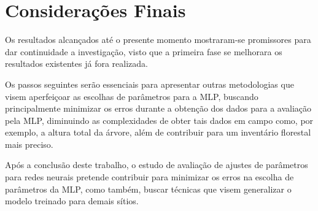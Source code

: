 \chapter{Considerações Finais}
\label{cap:consideracoes_finais}

Os resultados alcançados até o presente momento mostraram-se promissores para dar continuidade a investigação, visto que a primeira fase se melhorara os resultados existentes já fora realizada.

Os passos seguintes serão essenciais para apresentar outras metodologias que visem aperfeiçoar as escolhas de parâmetros para a MLP, buscando principalmente minimizar os erros durante a obtenção dos dados para a avaliação pela MLP, diminuindo as complexidades de obter tais dados em campo como, por exemplo, a altura total da árvore, além de contribuir para um inventário florestal mais preciso.

Após a conclusão deste trabalho, o estudo de avaliação de ajustes de parâmetros para redes neurais pretende contribuir para minimizar os erros na escolha de parâmetros da MLP, como também, buscar técnicas que visem generalizar o modelo treinado para demais sítios.
